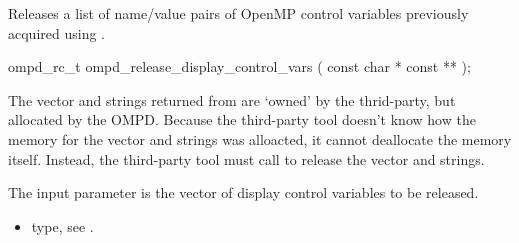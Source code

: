 Releases a list of name/value pairs of OpenMP control variables
previously acquired using .
\format
\cspecificstart
\begin{boxedcode}
ompd\_rc\_t ompd\_release\_display\_control\_vars (
  const char * const **
);
\end{boxedcode}
\cspecificend

\descr
The vector and strings returned from 
are `owned' by the thrid-party, but allocated by the OMPD.
Because the third-party tool doesn't know how the memory for the vector
and strings was alloacted, it cannot deallocate the memory itself.
Instead, the third-party tool must call
 to release the vector
and strings.

\argdesc
The input parameter  is the vector of display control variables to be released.

\crossreferences
\begin{itemize}
	\item {} type, see .
\end{itemize}
